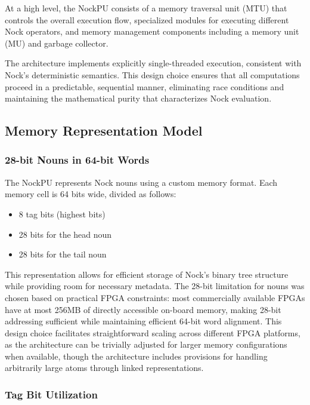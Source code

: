 \documentclass[twoside]{article}
\begin{document}
\noindent


At a high level, the NockPU consists of a memory traversal unit (MTU) that controls the overall execution flow, specialized modules for executing different Nock operators, and memory management components including a memory unit (MU) and garbage collector.

The architecture implements explicitly single-threaded execution, consistent with Nock's deterministic semantics. This design choice ensures that all computations proceed in a predictable, sequential manner, eliminating race conditions and maintaining the mathematical purity that characterizes Nock evaluation.

\subsection{Memory Representation Model}

\subsubsection{28-bit Nouns in 64-bit Words}

The NockPU represents Nock nouns using a custom memory format. Each memory cell is 64 bits wide, divided as follows:

\begin{itemize}
  \item 8 tag bits (highest bits)
  \item 28 bits for the head noun
  \item 28 bits for the tail noun
\end{itemize}

\noindent
This representation allows for efficient storage of Nock's binary tree structure while providing room for necessary metadata. The 28-bit limitation for nouns was chosen based on practical FPGA constraints: most commercially available FPGAs have at most 256MB of directly accessible on-board memory, making 28-bit addressing sufficient while maintaining efficient 64-bit word alignment. This design choice facilitates straightforward scaling across different FPGA platforms, as the architecture can be trivially adjusted for larger memory configurations when available, though the architecture includes provisions for handling arbitrarily large atoms through linked representations.

\subsubsection{Tag Bit Utilization}
\end{document}
